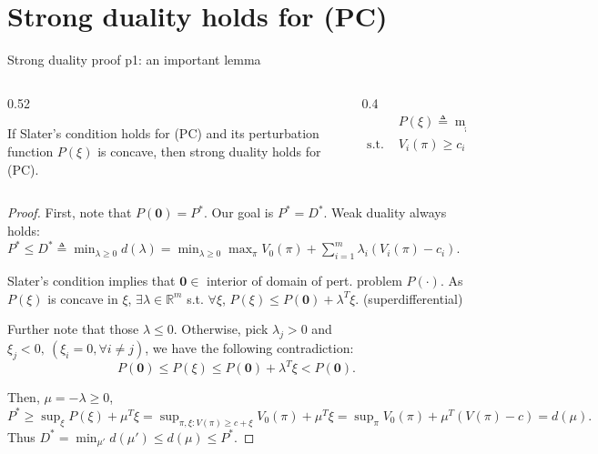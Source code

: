\documentclass[aspectratio=43, 10pt]{beamer}
\begin{document}
\section{Strong duality holds for (PC)}
    \begin{frame}[t]{Strong duality proof p1: an important lemma} 
    \vspace{-0.4cm}
    \begin{columns}
        \begin{column}{0.52\textwidth}
            \begin{lemma}
                If Slater's condition holds for (PC) and its perturbation function $P(\xi)$ is concave, then strong duality holds for (PC). 
            \end{lemma}
        \end{column}
        \begin{column}{0.4\textwidth}
            \begin{align*}
                  & P(\xi) \triangleq \max_{\pi} \  V_0(\pi) \\
                  \text{s.t. } & V_i(\pi) \geq c_i + \xi_i, \ i = 1,\dots,m.
              \end{align*}
        \end{column}
    \end{columns}
    \begin{proof}
        First, note that $P(\boldsymbol{0})=P^*$. Our goal is $P^*=D^*$. 
        Weak duality always holds: $P^* \leq D^* \triangleq \min_{\lambda\geq 0}d(\lambda)= \min_{\lambda\geq 0} \max_\pi V_0(\pi) + \sum_{i=1}^m \lambda_i (V_i(\pi)-c_i)$. 
        
        Slater's condition implies that $\boldsymbol{0} \in$ interior of domain of pert. problem $P(\cdot)$.  
        As $P(\xi)$ is concave in $\xi$, $\exists \lambda \in \mathbb{R}^m$ s.t. $\forall \xi$, $P(\xi)\leq P( \boldsymbol{0}) + \lambda^T \xi$. (superdifferential)

        \pause 
        Further note that those $\lambda \leq 0$. Otherwise, pick $\lambda_j >0$ and $\xi_j <0, ~(\xi_i=0, \forall i\neq j)$, we have the following contradiction: 
        $$P(\boldsymbol{0}) \leq P(\xi) \leq P( \boldsymbol{0}) + \lambda^T \xi < P(\boldsymbol{0}).$$
        
        Then, $ \mu = -\lambda \geq 0$, 
        $P^* \geq \sup_{\xi} P(\xi) + \mu^T \xi  = \sup_{\pi, \xi: V(\pi)\geq c+\xi} V_0(\pi)+ \mu^T \xi = \sup_{\pi} V_0(\pi)+\mu^T (V(\pi)-c) = d(\mu).$ 
        Thus $D^* = \min_{\mu'}d(\mu')\leq d(\mu) \leq P^*. $
    \end{proof}
    
    \end{frame}
\end{document}
